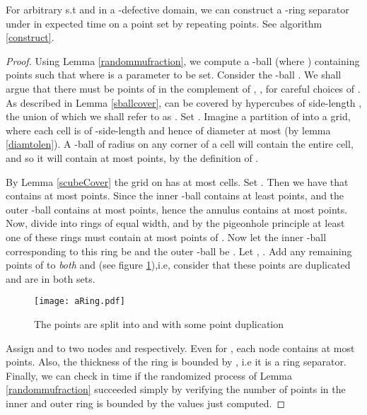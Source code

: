 \documentclass[11pt]{myclass}
\begin{document}
\begin{lemma} \label{improvedRing}
For arbitrary  s.t  and  in a -defective domain, we can construct a -ring separator  under  in  expected time on a point set  by repeating points. See algorithm \ref{construct}.
\end{lemma}
\begin{proof}


Using Lemma \ref{randommufraction}, we compute a -ball  (where ) 
containing  points such that  where  is a parameter to be set. 
Consider the -ball . We shall argue that there 
must be  points of  in the complement of , , for careful choices of .
As described in Lemma \ref{sballcover},  can be covered by  hypercubes of side-length 
, the union of which we shall refer to as . Set .  Imagine a partition of  
into a grid, where each cell is of -side-length  and hence of diameter at 
most  (by lemma \ref{diamtolen}). 
A -ball of radius  on any corner of a cell will contain the entire cell, and so it 
will contain at most  points, by the definition of . 

 By Lemma \ref{scubeCover} the grid on  has at most  cells.
 Set .  Then we have that  
contains at most  points.  
Since the inner -ball  contains at least  points, and the outer -ball  
contains at most  points, hence the annulus  contains at most 
 points. Now, divide  into  rings of equal width, 
and by the pigeonhole principle at least one of these rings must contain at most  
points of . Now let the inner -ball corresponding to this ring be  and the outer 
-ball 
be . Let , . Add any remaining points of  to \emph{both}  and (see figure \ref{aRing}),i.e,
consider that these points are duplicated and are in both sets. 


\begin{figure}[H]
  \begin{center}
    \texttt{[image: aRing.pdf]}
  \end{center}
  \caption{The points are split into  and  with some point duplication}
  \label{aRing}
\end{figure}

Assign  and  to two nodes  and  respectively.  Even for ,  each node contains at most 
 points. Also, the thickness of the ring is bounded by , i.e it 
is a  ring separator.
Finally, we can check in  time if the 
randomized process of Lemma \ref{randommufraction} succeeded simply by verifying the number of points
in the inner and outer ring is bounded by the values just computed.
\end{proof}
\end{document}
